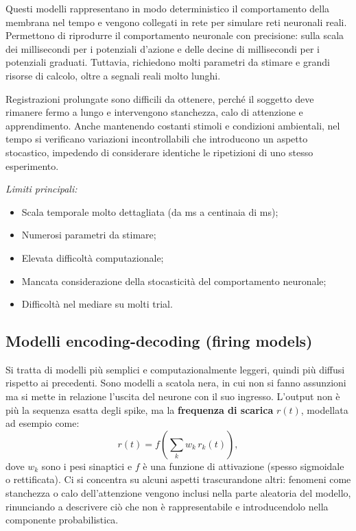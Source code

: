 Questi modelli rappresentano in modo deterministico il comportamento della membrana nel tempo e vengono collegati in rete per simulare reti neuronali reali. Permettono di riprodurre il comportamento neuronale con precisione: sulla scala dei millisecondi per i potenziali d’azione e delle decine di millisecondi per i potenziali graduati. Tuttavia, richiedono molti parametri da stimare e grandi risorse di calcolo, oltre a segnali reali molto lunghi.

Registrazioni prolungate sono difficili da ottenere, perché il soggetto deve rimanere fermo a lungo e intervengono stanchezza, calo di attenzione e apprendimento. Anche mantenendo costanti stimoli e condizioni ambientali, nel tempo si verificano variazioni incontrollabili che introducono un aspetto stocastico, impedendo di considerare identiche le ripetizioni di uno stesso esperimento.

\textit{Limiti principali:}
\begin{itemize}
  \item Scala temporale molto dettagliata (da ms a centinaia di ms);
  \item Numerosi parametri da stimare;
  \item Elevata difficoltà computazionale;
  \item Mancata considerazione della stocasticità del comportamento neuronale;
  \item Difficoltà nel mediare su molti trial.
\end{itemize}

\subsection{Modelli encoding-decoding (firing models)}
Si tratta di modelli più semplici e computazionalmente leggeri, quindi più diffusi rispetto ai precedenti. Sono modelli a scatola nera, in cui non si fanno assunzioni ma si mette in relazione l’uscita del neurone con il suo ingresso. L’output non è più la sequenza esatta degli spike, ma la \textbf{frequenza di scarica} $r(t)$, modellata ad esempio come:
\[
r(t) = f\!\left( \sum_{k} w_k \, r_k(t) \right),
\]
dove $w_k$ sono i pesi sinaptici e $f$ è una funzione di attivazione (spesso sigmoidale o rettificata). Ci si concentra su alcuni aspetti trascurandone altri: fenomeni come stanchezza o calo dell’attenzione vengono inclusi nella parte aleatoria del modello, rinunciando a descrivere ciò che non è rappresentabile e introducendolo nella componente probabilistica.

